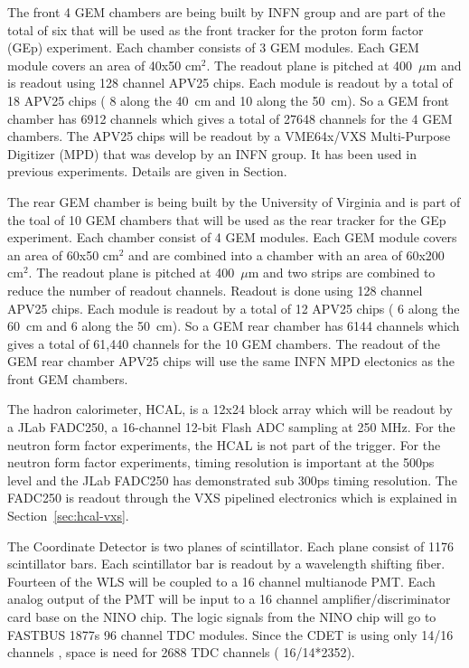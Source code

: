 \documentclass{article}
\begin{document}
The front 4 GEM chambers are being built by INFN group and are part of the total of six that
will be used as the front tracker for the proton form factor (GEp) experiment. Each chamber consists
of 3 GEM modules. Each GEM module covers an area of 40x50 cm$^2$. The readout plane is pitched at 400~$\mu$m
and is readout using 128 channel APV25 chips. Each module is readout by a total of 18 APV25 chips ( 8 along
the 40~cm and 10 along the 50~cm). So a GEM front chamber has 6912 channels which gives a total of 27648 channels
for the 4 GEM chambers. The APV25 chips will be readout by a VME64x/VXS Multi-Purpose Digitizer (MPD) that was
develop by an INFN group. It has been used in previous experiments. Details are given in Section.

The rear GEM chamber is being built by the University of Virginia and is part of the toal of 10 GEM chambers
that will be used as the rear tracker for the GEp experiment. Each chamber consist of 4 GEM modules.
 Each GEM module covers an area of 60x50 cm$^2$ and are combined into a chamber with an area
of 60x200 cm$^2$. The readout plane is pitched at 400~$\mu$m and two strips are combined to reduce
the number of readout channels. Readout is done using 128 channel APV25 chips. Each module is readout 
by a total of  12 APV25 chips (  6 along the 60~cm and 6 along the 50~cm). So a GEM rear chamber has  
6144 channels which gives a total of 61,440 channels for the 10 GEM chambers. The readout of the GEM
rear chamber APV25 chips will use the same INFN MPD electonics as the front GEM chambers.  
 
The hadron calorimeter, HCAL, is a 12x24 block array which will be readout 
by a JLab FADC250, a 16-channel 12-bit Flash 
ADC sampling at 250 MHz. For the neutron form factor experiments, the HCAL is not part of the trigger. For the
neutron form factor experiments, timing resolution is important at the 500ps level and the JLab FADC250 has 
demonstrated sub 300ps timing resolution. The FADC250 is readout through the VXS pipelined electronics
which is explained in Section~\ref{sec:hcal-vxs}.


The Coordinate Detector is  two planes of scintillator. Each plane consist of 1176 scintillator bars. 
Each scintillator bar is readout by a wavelength shifting fiber. Fourteen of the WLS  will be coupled to
a 16 channel multianode PMT. Each analog output of the PMT will be input to a 16 channel amplifier/discriminator
card base on the NINO chip. The logic signals from the NINO chip will go to FASTBUS 1877s 96 channel TDC modules.
Since the CDET is using only 14/16 channels , space is need for 2688 TDC channels ( 16/14*2352).
 
\end{document}
